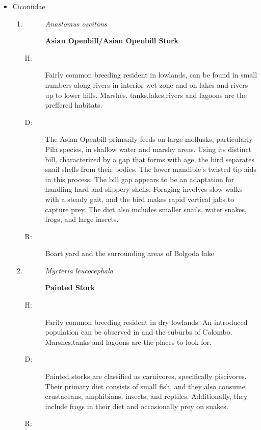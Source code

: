 \begin{itemize}
\begin{enumerate}
\end{enumerate}%
\item%
Ciconiidae%
\begin{enumerate}%
\item%
\begin{description}%
\item[]%
\textit{Anastomus oscitans}%
\item[]%
\textbf{Asian Openbill/Asian Openbill Stork}%
\end{description}%
\begin{description}%
\item[H: ]%
Fairly common breeding resident in lowlands, can be found in small numbers along rivers in interior wet zone and on lakes and rivers up to lower hills. Marshes, tanks,lakes,rivers and lagoons are the preffered habitats.%
\item[D: ]%
The Asian Openbill primarily feeds on large mollusks, particularly Pila species, in shallow water and marshy areas. Using its distinct bill, characterized by a gap that forms with age, the bird separates snail shells from their bodies. The lower mandible's twisted tip aids in this process. The bill gap appears to be an adaptation for handling hard and slippery shells. Foraging involves slow walks with a steady gait, and the bird makes rapid vertical jabs to capture prey. The diet also includes smaller snails, water snakes, frogs, and large insects.%
\item[R: ]%
Boart yard and the surrounding areas of Bolgoda lake%
\end{description}%
\item%
\begin{description}%
\item[]%
\textit{Mycteria leucocephala}%
\item[]%
\textbf{Painted Stork}%
\end{description}%
\begin{description}%
\item[H: ]%
Farily common breeding resident in dry lowlands. An introduced population can be observed in and the suburbs of Colombo. Marshes,tanks and lagoons are the places to look for.%
\item[D: ]%
Painted storks are classified as carnivores, specifically piscivores. Their primary diet consists of small fish, and they also consume crustaceans, amphibians, insects, and reptiles. Additionally, they include frogs in their diet and occasionally prey on snakes.%
\item[R: ]%

\end{description}
\end{enumerate}
\end{itemize}
